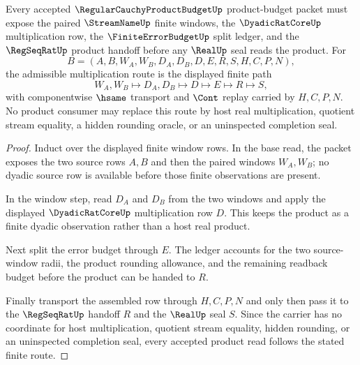 \begin{theorem}
\label{thm:regular-cauchy-product-budget-dyadic-multiplication-scope}
Every accepted $\RegularCauchyProductBudgetUp$ product-budget packet must expose the paired $\StreamNameUp$ finite windows, the $\DyadicRatCoreUp$ multiplication row, the $\FiniteErrorBudgetUp$ split ledger, and the $\RegSeqRatUp$ product handoff before any $\RealUp$ seal reads the product. For
$$
B=(A,B,W_A,W_B,D_A,D_B,D,E,R,S,H,C,P,N),
$$
the admissible multiplication route is the displayed finite path
$$
W_A,W_B \longmapsto D_A,D_B \longmapsto D \longmapsto E \longmapsto R \longmapsto S,
$$
with componentwise $\hsame$ transport and $\Cont$ replay carried by $H,C,P,N$. No product consumer may replace this route by host real multiplication, quotient stream equality, a hidden rounding oracle, or an uninspected completion seal.
\end{theorem}
\begin{proof}
Induct over the displayed finite window rows. In the base read, the packet exposes the two source rows $A,B$ and then the paired windows $W_A,W_B$; no dyadic source row is available before those finite observations are present.

In the window step, read $D_A$ and $D_B$ from the two windows and apply the displayed $\DyadicRatCoreUp$ multiplication row $D$. This keeps the product as a finite dyadic observation rather than a host real product.

Next split the error budget through $E$. The ledger accounts for the two source-window radii, the product rounding allowance, and the remaining readback budget before the product can be handed to $R$.

Finally transport the assembled row through $H,C,P,N$ and only then pass it to the $\RegSeqRatUp$ handoff $R$ and the $\RealUp$ seal $S$. Since the carrier has no coordinate for host multiplication, quotient stream equality, hidden rounding, or an uninspected completion seal, every accepted product read follows the stated finite route.
\end{proof}


